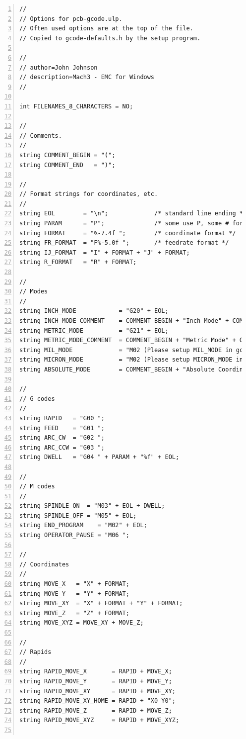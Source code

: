 \documentclass[11pt]{book}
\begin{document}
\begin{lstlisting}[numbers=left,
	breaklines=true,	
	numberstyle=\tiny\color{gray},
	basicstyle=\ttfamily\tiny
]
//
// Options for pcb-gcode.ulp.
// Often used options are at the top of the file.
// Copied to gcode-defaults.h by the setup program.

//
// author=John Johnson
// description=Mach3 - EMC for Windows
//

int FILENAMES_8_CHARACTERS = NO;

//
// Comments.
//
string COMMENT_BEGIN = "(";
string COMMENT_END   = ")";

// 
// Format strings for coordinates, etc.
//
string EOL        = "\n";             /* standard line ending */
string PARAM      = "P";              /* some use P, some # for parameters */
string FORMAT     = "%-7.4f ";        /* coordinate format */
string FR_FORMAT  = "F%-5.0f ";       /* feedrate format */
string IJ_FORMAT  = "I" + FORMAT + "J" + FORMAT;
string R_FORMAT   = "R" + FORMAT;

//
// Modes
//
string INCH_MODE            = "G20" + EOL;
string INCH_MODE_COMMENT    = COMMENT_BEGIN + "Inch Mode" + COMMENT_END + EOL;
string METRIC_MODE          = "G21" + EOL;
string METRIC_MODE_COMMENT  = COMMENT_BEGIN + "Metric Mode" + COMMENT_END + EOL;
string MIL_MODE             = "M02 (Please setup MIL_MODE in gcode-defaults.h)" + EOL;
string MICRON_MODE          = "M02 (Please setup MICRON_MODE in gcode-defaults.h)" + EOL;
string ABSOLUTE_MODE        = COMMENT_BEGIN + "Absolute Coordinates" + COMMENT_END + EOL + "G90" + EOL;

//
// G codes
//
string RAPID   = "G00 ";
string FEED    = "G01 ";
string ARC_CW  = "G02 ";
string ARC_CCW = "G03 ";
string DWELL   = "G04 " + PARAM + "%f" + EOL;

//
// M codes
//
string SPINDLE_ON  = "M03" + EOL + DWELL;
string SPINDLE_OFF = "M05" + EOL;
string END_PROGRAM    = "M02" + EOL;
string OPERATOR_PAUSE = "M06 ";

//
// Coordinates
//
string MOVE_X   = "X" + FORMAT;
string MOVE_Y   = "Y" + FORMAT;
string MOVE_XY  = "X" + FORMAT + "Y" + FORMAT;
string MOVE_Z   = "Z" + FORMAT;
string MOVE_XYZ = MOVE_XY + MOVE_Z;

//
// Rapids
//
string RAPID_MOVE_X       = RAPID + MOVE_X;
string RAPID_MOVE_Y       = RAPID + MOVE_Y;
string RAPID_MOVE_XY      = RAPID + MOVE_XY;
string RAPID_MOVE_XY_HOME = RAPID + "X0 Y0";
string RAPID_MOVE_Z       = RAPID + MOVE_Z;
string RAPID_MOVE_XYZ     = RAPID + MOVE_XYZ;


\end{lstlisting}
\end{document}

